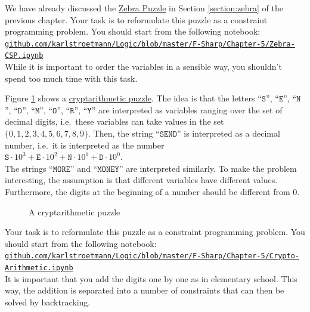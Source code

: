 \exerciseEng
We have already discussed the \href{https://en.wikipedia.org/wiki/Zebra_puzzle}{Zebra Puzzle} in Section
\ref{section:zebra} of the previous chapter.  Your task is to reformulate this puzzle as a constraint
programming problem.  You should start from the following notebook:
\\[0.2cm]
\hspace*{1.3cm}
\href{https://github.com/karlstroetmann/Logic/blob/master/F-Sharp/Chapter-5/Zebra-CSP.ipynb}{\texttt{github.com/karlstroetmann/Logic/blob/master/F-Sharp/Chapter-5/Zebra-CSP.ipynb}}
\\[0.2cm]
While it is important to order the variables in a sensible way, you shouldn't spend too much time with this
task.
\eox

\exerciseEng
Figure \ref{fig:send-more-money.pdf} shows a
\href{https://en.wikipedia.org/wiki/Verbal_arithmetic}{cryptarithmetic puzzle}.
The idea is that the letters 
``$\texttt{S}$'', ``$\texttt{E}$'', ``$\texttt{N}$'', ``$\texttt{D}$'', ``$\texttt{M}$'', ``$\texttt{O}$'', ``$\texttt{R}$'', ``$\texttt{Y}$'' 
are interpreted as variables ranging over the set of decimal digits, i.e.~these variables can take values in
the set $\{0,1,2,3,4,5,6,7,8,9\}$.  Then, the string ``$\texttt{SEND}$'' is interpreted as a decimal number,
i.e.~it is interpreted as the number
\\[0.2cm]
\hspace*{1.3cm}
$\texttt{S} \cdot 10^3 + \texttt{E} \cdot 10^2 + \texttt{N} \cdot 10^1 + \texttt{D} \cdot 10^0$.
\\[0.2cm]
The strings ``$\texttt{MORE}$'' and ``$\texttt{MONEY}$'' are interpreted similarly. To make the problem
interesting, the assumption is that different variables have different values.  Furthermore, the
digits at the beginning of a number should be different from $0$.


\begin{figure}[!ht]
\centering
{}

\caption{A cryptarithmetic puzzle}
\label{fig:send-more-money.pdf}
\end{figure}

Your task is to reformulate this puzzle as a constraint
programming problem.  You should start from the following notebook:
\\[0.2cm]
\href{https://github.com/karlstroetmann/Logic/blob/master/F-Sharp/Chapter-5/Crypto-Arithmetic.ipynb}{\small\texttt{github.com/karlstroetmann/Logic/blob/master/F-Sharp/Chapter-5/Crypto-Arithmetic.ipynb}}
\\[0.2cm]
It is important that you add the digits one by one as in elementary school.  This way, the addition is
separated into a number of constraints that can then be solved by backtracking.  \eox

